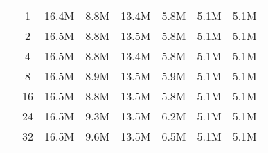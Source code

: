 \begin{tabular}{c | c || c c | c c | c c}
	\hline
{}  & 1 &  16.4M & 8.8M &  13.4M & 5.8M &  5.1M & 5.1M \\
 & 2 &  16.5M & 8.8M &  13.5M & 5.8M &  5.1M & 5.1M \\
 & 4 &  16.5M & 8.8M &  13.4M & 5.8M &  5.1M & 5.1M \\
 & 8 &  16.5M & 8.9M &  13.5M & 5.9M &  5.1M & 5.1M \\
 & 16 &  16.5M & 8.8M &  13.5M & 5.8M &  5.1M & 5.1M \\
 & 24 &  16.5M & 9.3M &  13.5M & 6.2M &  5.1M & 5.1M \\
 & 32 &  16.5M & 9.6M &  13.5M & 6.5M &  5.1M & 5.1M \\
	\hline
\end{tabular}
